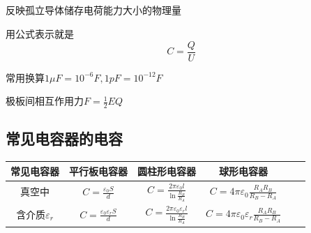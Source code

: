 \documentclass[lang=cn,10pt]{elegantbook}
\begin{document}
		\subsection{\color{red}}
		\begin{definition}[电容]
			反映孤立导体储存电荷能力大小的物理量
			
			用公式表示就是
			\begin{equation*}
				C=\frac{Q}{U}
			\end{equation*}
		\end{definition}
		\begin{remark}
			常用换算$1\mu F=10^{-6}F,1pF=10^{-12}F$
		\end{remark}
		\begin{remark}
		极板间相互作用力$F=\frac{1}{2}EQ$
		\end{remark}
		
		\subsection{常见电容器的电容}
		\begin{tabular}{|c|c|c|c|c|c|}
			\hline
		常见电容器	& 平行板电容器 & 圆柱形电容器 &球形电容器  \\
			\hline
		真空中	&$C=\frac{\varepsilon _0S}{d}$  & $C=\frac{2\pi \varepsilon _0l}{\ln \frac{R_B}{R_A}}$ &$C=4\pi \varepsilon _0\frac{R_AR_B}{R_B-R_A}$    \\
			\hline
		含介质$\varepsilon_{r}$	&$C=\frac{\varepsilon _0\varepsilon_{r} S}{d}$  & $C=\frac{2\pi \varepsilon _0\varepsilon _{r}l}{\ln \frac{R_B}{R_A}}$ &$C=4\pi \varepsilon _0\varepsilon_{r}\frac{R_AR_B}{R_B-R_A}$    \\
			\hline
		\end{tabular}
\end{document}
